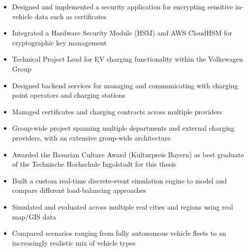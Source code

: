 \documentclass[]{project-reference}
\begin{document}

\begin{itemize}
  \item Designed and implemented a security application for encrypting sensitive in-vehicle data such as certificates
  \item Integrated a Hardware Security Module (HSM) and AWS CloudHSM for cryptographic key management
\end{itemize}

\projectsep



\begin{itemize}
  \item Technical Project Lead for EV charging functionality within the Volkswagen Group
  \item Designed backend services for managing and communicating with charging point operators and charging stations
  \item Managed certificates and charging contracts across multiple providers
  \item Group-wide project spanning multiple departments and external charging providers, with an extensive group-wide architecture
\end{itemize}

\projectsep



\begin{itemize}
  \item Awarded the Bavarian Culture Award (Kulturpreis Bayern) as best graduate of the Technische Hochschule Ingolstadt for this thesis
  \item Built a custom real-time discrete-event simulation engine to model and compare different load-balancing approaches
  \item Simulated and evaluated across multiple real cities and regions using real map/GIS data
  \item Compared scenarios ranging from fully autonomous vehicle fleets to an increasingly realistic mix of vehicle types
\end{itemize}
\end{document}
